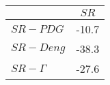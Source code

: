 \begin{tabular}{l|c}
\toprule
{} &  $SR$ \\
\midrule
\textbf{$SR-PDG$   } & -10.7 \\
\textbf{$SR-Deng$  } & -38.3 \\
\textbf{$SR-\Gamma$} & -27.6 \\
\bottomrule
\end{tabular}
